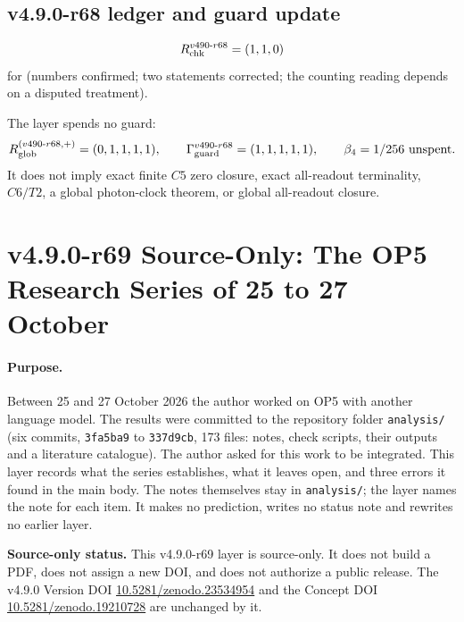 \subsection*{v4.9.0-r68 ledger and guard update}
\label{subsec:v490-r68-ledger-guard}

\[
R_{\rm chk}^{v490\text{-}r68}=(1,1,0)
\]
for (numbers confirmed; two statements corrected; the counting reading depends on a disputed treatment).

The layer spends no guard:
\[
R_{\rm glob}^{(v490\text{-}r68,+)}=(0,1,1,1,1),
\qquad
\Gamma_{\rm guard}^{v490\text{-}r68}=(1,1,1,1,1),
\qquad
\beta_4=1/256\ \text{unspent}.
\]
It does not imply exact finite \(C5\) zero closure, exact all-readout terminality,
\(C6/T2\), a global photon-clock theorem, or global all-readout closure.

\clearpage
\section*{v4.9.0-r69 Source-Only: The OP5 Research Series of 25 to 27 October}
\label{sec:v490-r69-op5-series}

\paragraph{Purpose.}
Between 25 and 27 October 2026 the author worked on OP5 with another language model.  The results were committed to the repository folder
\texttt{analysis/} (six commits, \texttt{3fa5ba9} to \texttt{337d9cb}, 173 files: notes, check scripts, their outputs and a literature catalogue).
The author asked for this work to be integrated.  This layer records what the series establishes, what it leaves open, and three errors it found in
the main body.  The notes themselves stay in \texttt{analysis/}; the layer names the note for each item.  It makes no prediction, writes no status
note and rewrites no earlier layer.

\noindent\textbf{Source-only status.}
This v4.9.0-r69 layer is source-only.  It does not build a PDF, does not assign a new DOI,
and does not authorize a public release.  The v4.9.0 Version DOI
\href{https://doi.org/10.5281/zenodo.23534954}{10.5281/zenodo.23534954} and the Concept DOI
\href{https://doi.org/10.5281/zenodo.19210728}{10.5281/zenodo.19210728} are unchanged by it.

